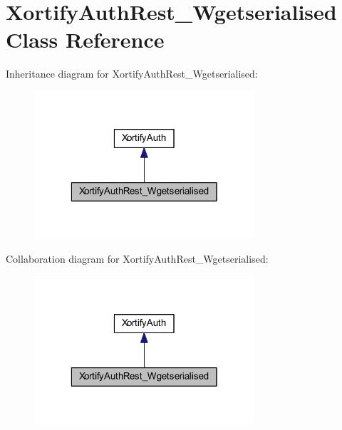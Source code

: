 \hypertarget{class_xortify_auth_rest___wgetserialised}{\section{Xortify\-Auth\-Rest\-\_\-\-Wgetserialised Class Reference}
\label{class_xortify_auth_rest___wgetserialised}
}


Inheritance diagram for Xortify\-Auth\-Rest\-\_\-\-Wgetserialised\-:
\nopagebreak
\begin{figure}[H]
\begin{center}
\leavevmode
\includegraphics[width=232pt]{class_xortify_auth_rest___wgetserialised__inherit__graph}
\end{center}
\end{figure}


Collaboration diagram for Xortify\-Auth\-Rest\-\_\-\-Wgetserialised\-:
\nopagebreak
\begin{figure}[H]
\begin{center}
\leavevmode
\includegraphics[width=232pt]{class_xortify_auth_rest___wgetserialised__coll__graph}
\end{center}
\end{figure}
